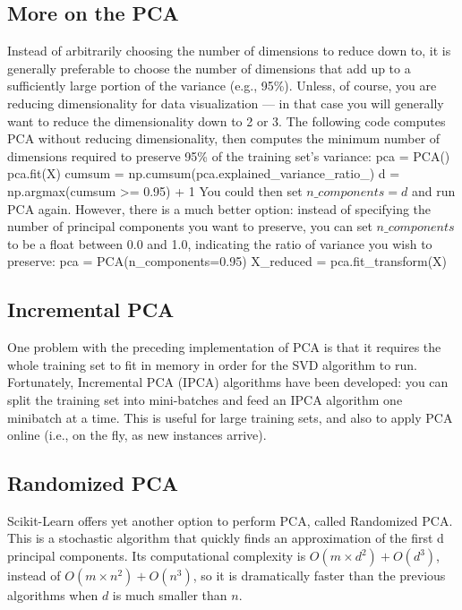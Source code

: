 \documentclass[%
oneside,                 %
final,                   %
10pt]{article}
\begin{document}
\subsection{More on the PCA}

Instead of arbitrarily choosing the number of dimensions to reduce down to, it is generally preferable to
choose the number of dimensions that add up to a sufficiently large portion of the variance (e.g., 95\%).
Unless, of course, you are reducing dimensionality for data visualization — in that case you will
generally want to reduce the dimensionality down to 2 or 3.
The following code computes PCA without reducing dimensionality, then computes the minimum number
of dimensions required to preserve 95\% of the training set’s variance:
\bpycod
pca = PCA()
pca.fit(X)
cumsum = np.cumsum(pca.explained_variance_ratio_)
d = np.argmax(cumsum >= 0.95) + 1
\epycod
You could then set $n\_components=d$ and run PCA again. However, there is a much better option: instead
of specifying the number of principal components you want to preserve, you can set $n\_components$ to be
a float between 0.0 and 1.0, indicating the ratio of variance you wish to preserve:
\bpycod
pca = PCA(n_components=0.95)
X_reduced = pca.fit_transform(X)
\epycod

\subsection{Incremental PCA}

One problem with the preceding implementation of PCA is that it requires the whole training set to fit in
memory in order for the SVD algorithm to run. Fortunately, Incremental PCA (IPCA) algorithms have
been developed: you can split the training set into mini-batches and feed an IPCA algorithm one minibatch
at a time. This is useful for large training sets, and also to apply PCA online (i.e., on the fly, as new
instances arrive).

\subsection{Randomized PCA}

Scikit-Learn offers yet another option to perform PCA, called Randomized PCA. This is a stochastic
algorithm that quickly finds an approximation of the first d principal components. Its computational
complexity is $O(m \times d^2)+O(d^3)$, instead of $O(m \times n^2) + O(n^3)$, so it is dramatically faster than the
previous algorithms when $d$ is much smaller than $n$.
\end{document}
